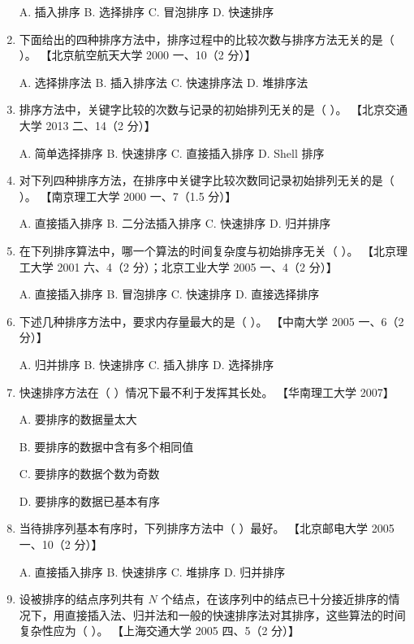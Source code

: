 \documentclass[lang=cn,newtx,10pt,scheme=chinese]{../../elegantbook}
\begin{document}
\begin{enumerate}
    A. 插入排序 \quad B. 选择排序 \quad C. 冒泡排序 \quad D. 快速排序  

    \item 下面给出的四种排序方法中，排序过程中的比较次数与排序方法无关的是（ ）。  
    【北京航空航天大学 2000 一、10（2 分）】

    A. 选择排序法 \quad B. 插入排序法 \quad C. 快速排序法 \quad D. 堆排序法  

    \item 排序方法中，关键字比较的次数与记录的初始排列无关的是（ ）。  
    【北京交通大学 2013 二、14（2 分）】  

    A. 简单选择排序 \quad B. 快速排序 \quad C. 直接插入排序 \quad D. Shell 排序  

    \item 对下列四种排序方法，在排序中关键字比较次数同记录初始排列无关的是（ ）。  
    【南京理工大学 2000 一、7（1.5 分）】  

    A. 直接插入排序 \quad B. 二分法插入排序 \quad C. 快速排序 \quad D. 归并排序  

    \item 在下列排序算法中，哪一个算法的时间复杂度与初始排序无关（ ）。  
    【北京理工大学 2001 六、4（2 分）；北京工业大学 2005 一、4（2 分）】  

    A. 直接插入排序 \quad B. 冒泡排序 \quad C. 快速排序 \quad D. 直接选择排序  

    \item 下述几种排序方法中，要求内存量最大的是（ ）。  
    【中南大学 2005 一、6（2 分）】

    A. 归并排序 \quad B. 快速排序 \quad C. 插入排序 \quad D. 选择排序  

    \item 快速排序方法在（ ）情况下最不利于发挥其长处。  
    【华南理工大学 2007】  


    A. 要排序的数据量太大
     
    B. 要排序的数据中含有多个相同值  

    C. 要排序的数据个数为奇数  

    D. 要排序的数据已基本有序  

    \item 当待排序列基本有序时，下列排序方法中（ ）最好。  
    【北京邮电大学 2005 一、10（2 分）】  

    A. 直接插入排序 \quad B. 快速排序 \quad C. 堆排序 \quad D. 归并排序 

    \item 设被排序的结点序列共有 $N$ 个结点，在该序列中的结点已十分接近排序的情况下，用直接插入法、归并法和一般的快速排序法对其排序，这些算法的时间复杂性应为（ ）。  
    【上海交通大学 2005 四、5（2 分）】  


\end{enumerate}
\end{document}
